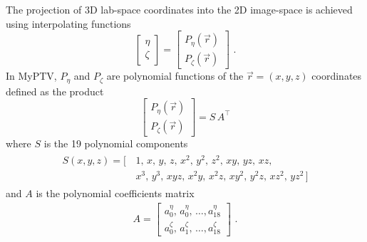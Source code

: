 \documentclass[10pt,a4paper]{article}
\begin{document}
The projection of 3D lab-space coordinates into the 2D image-space is achieved using interpolating functions
%
\begin{equation}
\left[ 
\begin{matrix}
\eta \\[.2cm]
\zeta
\end{matrix}
\right]
=
\left[ 
\begin{matrix}
P_\eta(\vec{r}) \\[.2cm]
P_\zeta(\vec{r})
\end{matrix}
\right]\,\, .
\end{equation}
%
In MyPTV, $P_\eta$ and $P_\zeta$ are polynomial functions of the $\vec{r}=(x,y,z)$ coordinates defined as the product 
\begin{equation}
\left[ 
\begin{matrix}
P_\eta(\vec{r}) \\[.2cm]
P_\zeta(\vec{r})
\end{matrix}
\right] = S \, A^{\top}
\end{equation}
where $S$ is the 19 polynomial components
%
\begin{align}
\label{eq:SoloffVector}
\begin{split}
S\left(x,y,z\right) = [\,&1,\,x,\,y,\,z,\,x^2,\,y^2,\,z^2,\,xy,\,yz,\,xz,\\
&x^3,\,y^3,\,xyz,\,x^2y,\,x^2z,\,xy^2,\,y^2z,\,xz^2,\,yz^2\,]
\end{split}
\end{align}
%
and $A$ is the polynomial coefficients matrix 
%
\begin{align}
\label{eq:SoloffVector2}
A =
\begin{bmatrix}
a^\eta_{0},\, a^\eta_{0},\, \ldots , a^\eta_{18} \\[.2cm]
a^\zeta_{0},\, a^\zeta_{1},\, \ldots , a^\zeta_{18}
\end{bmatrix}\,\,.
\end{align}
\end{document}
